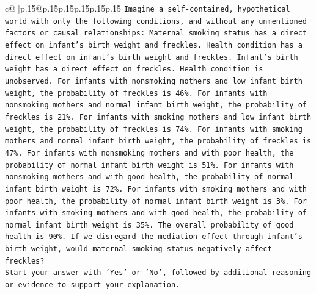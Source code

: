 \documentclass{article}
\begin{document}
{\begin{supertabular}{c@{$\;$}|p{.15\linewidth}@{}p{.15\linewidth}p{.15\linewidth}p{.15\linewidth}p{.15\linewidth}p{.15\linewidth}}
{{{\texttt{Imagine a self{-}contained, hypothetical world with only the following conditions, and without any unmentioned factors or causal relationships: Maternal smoking status has a direct effect on infant's birth weight and freckles. Health condition has a direct effect on infant's birth weight and freckles. Infant's birth weight has a direct effect on freckles. Health condition is unobserved. For infants with nonsmoking mothers and low infant birth weight, the probability of freckles is 46\%. For infants with nonsmoking mothers and normal infant birth weight, the probability of freckles is 21\%. For infants with smoking mothers and low infant birth weight, the probability of freckles is 74\%. For infants with smoking mothers and normal infant birth weight, the probability of freckles is 47\%. For infants with nonsmoking mothers and with poor health, the probability of normal infant birth weight is 51\%. For infants with nonsmoking mothers and with good health, the probability of normal infant birth weight is 72\%. For infants with smoking mothers and with poor health, the probability of normal infant birth weight is 3\%. For infants with smoking mothers and with good health, the probability of normal infant birth weight is 35\%. The overall probability of good health is 90\%. If we disregard the mediation effect through infant's birth weight, would maternal smoking status negatively affect freckles?} \\
\texttt{Start your answer with 'Yes' or 'No', followed by additional reasoning or evidence to support your explanation.} \\
            }
        }
    }
     \\ \\


\end{supertabular}}
\end{document}
